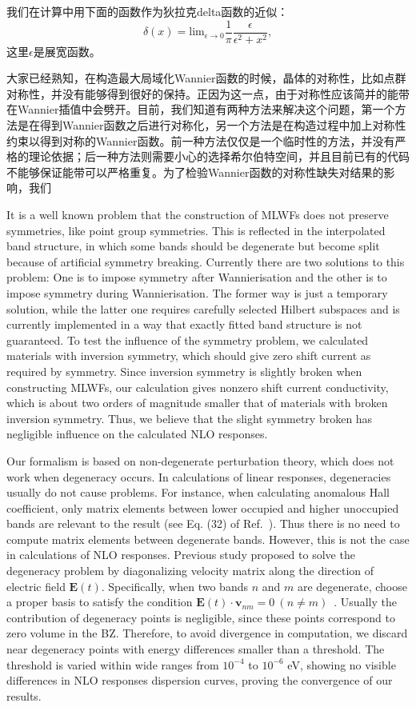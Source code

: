 我们在计算中用下面的函数作为狄拉克delta函数的近似：
\[
\delta(x) = \text{lim}_{\epsilon\to0}\frac{1}{\pi}\frac{\epsilon}{\epsilon^{2}+x^{2}},
\]
这里$\epsilon$是展宽函数。

大家已经熟知，在构造最大局域化Wannier函数的时候，晶体的对称性，比如点群对称性，并没有能够得到很好的保持。正因为这一点，由于对称性应该简并的能带在Wannier插值中会劈开。目前，我们知道有两种方法来解决这个问题，第一个方法是在得到Wannier函数之后进行对称化，另一个方法是在构造过程中加上对称性约束以得到对称的Wannier函数。前一种方法仅仅是一个临时性的方法，并没有严格的理论依据；后一种方法则需要小心的选择希尔伯特空间，并且目前已有的代码不能够保证能带可以严格重复。为了检验Wannier函数的对称性缺失对结果的影响，我们

It is a well known problem that the construction of MLWFs does not preserve symmetries, like point group symmetries. This is reflected in the interpolated band structure, in which some bands should be degenerate but become split because of artificial symmetry breaking. Currently there are two solutions to this problem: One is to impose symmetry after Wannierisation and the other is to impose symmetry during Wannierisation\cite{sakuma_symmetry-adapted_2013}. The former way is just a temporary solution, while the latter one requires carefully selected Hilbert subspaces and is currently implemented in a way that exactly fitted band structure is not guaranteed. To test the influence of the symmetry problem, we calculated materials with inversion symmetry, which should give zero shift current as required by symmetry. Since inversion symmetry is slightly broken when constructing MLWFs, our calculation gives nonzero shift current conductivity, which is about two orders of magnitude smaller that of materials with broken inversion symmetry. Thus, we believe that the slight symmetry broken has negligible influence on the calculated NLO responses.

Our formalism is based on non-degenerate perturbation theory, which does not work when degeneracy occurs. In calculations of linear responses, degeneracies usually do not cause problems. For instance, when calculating anomalous Hall coefficient, only matrix elements between lower occupied and higher unoccupied bands are relevant to the result (see Eq. (32) of Ref.~). Thus there is no need to compute matrix elements between degenerate bands. However, this is not the case in calculations of NLO responses. Previous study proposed to solve the degeneracy problem by diagonalizing velocity matrix along the direction of electric field $\mathbf{E}(t)$. Specifically, when two bands $n$ and $m$ are degenerate, choose a proper basis to satisfy the condition $\mathbf{E}(t)\cdot\mathbf{v}_{nm}=0  \ (n\ne m)$~\cite{sipe_second-order_2000}. Usually the contribution of degeneracy points is negligible, since these points correspond to zero volume in the BZ. Therefore, to avoid divergence in computation, we discard near degeneracy points with energy differences smaller than a threshold. The threshold is varied within wide ranges from $10^{-4}$ to $10^{-6}$ eV, showing no visible differences in NLO responses dispersion curves, proving the convergence of our results.
